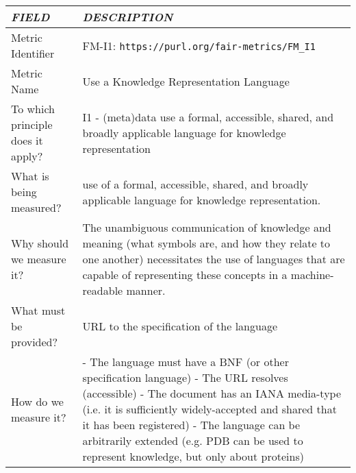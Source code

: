\documentclass[english]{article}
\begin{document}
\begin{longtable}{|p{5cm}|p{9cm}|}


\hline
\emph{FIELD} & \emph{DESCRIPTION} \\
\hline
Metric Identifier &   FM-I1: \verb"https://purl.org/fair-metrics/FM_I1"
\\


\hline
Metric Name &   

Use a Knowledge Representation Language


 \\



\hline
To which principle does it apply? &   



I1 - (meta)data use a formal, accessible, shared, and broadly applicable language for knowledge representation

\\



\hline
What is being measured? & 



use of a formal, accessible, shared, and broadly applicable language for knowledge representation.


\\



\hline
Why should we measure it? & 




The unambiguous communication of knowledge and meaning (what symbols are, and how they relate to one another) necessitates the use of languages that are capable of representing these concepts in a machine-readable manner.  
  
\\



\hline
What must be provided? &  

URL to the specification of the language


\\



\hline
How do we measure it? &  

- The language must have a BNF (or other specification language) \newline 
- The URL resolves (accessible) \newline 
- The document has an IANA media-type (i.e. it is sufficiently widely-accepted and shared that it has been registered) \newline 
- The language can be arbitrarily extended (e.g. PDB can be used to represent knowledge, but only about proteins) \newline 




\end{longtable}
\end{document}
